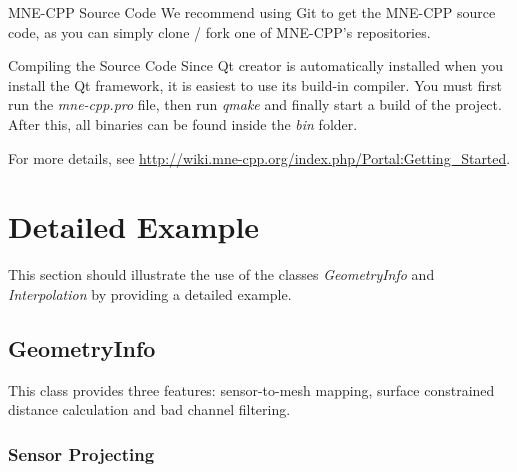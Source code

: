 \begin{aims}
	\item[\hspace*{11mm} MNE-CPP Source Code] We recommend using Git to get the MNE-CPP source code, as you can simply clone / fork one of MNE-CPP's repositories.
\end{aims}

\begin{aims}
	\item[\hspace*{11mm} Compiling the Source Code] Since Qt creator is automatically installed when you install the Qt framework, it is easiest to use its build-in compiler. You must first run the \textit{mne-cpp.pro} file, then run \textit{qmake} and finally start a build of the project. After this, all binaries can be found inside the \textit{bin} folder.
\end{aims}

For more details, see \url{http://wiki.mne-cpp.org/index.php/Portal:Getting_Started}.

\clearpage

\section{Detailed Example}

This section should illustrate the use of the classes \textit{GeometryInfo} and \textit{Interpolation} by providing a detailed example.

\subsection{GeometryInfo}

This class provides three features: sensor-to-mesh mapping, surface constrained distance calculation and bad channel filtering.

\subsubsection{Sensor Projecting}

